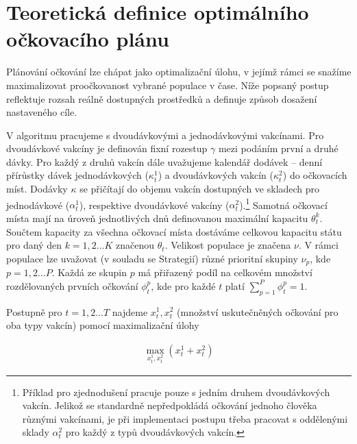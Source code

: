 \section*{Teoretická definice optimálního očkovacího plánu} 
\label{sec_vypocet}

Plánování očkování lze chápat jako optimalizační úlohu, v jejímž rámci se snažíme maximalizovat proočkovanost vybrané populace v čase. Níže popsaný postup reflektuje rozsah reálně dostupných prostředků a definuje způsob dosažení nastaveného cíle.


V algoritmu pracujeme s dvoudávkovými a jednodávkovými vakcínami. Pro dvoudávkové vakcíny je definován fixní rozestup $\gamma$ mezi podáním první a druhé dávky. Pro každý z druhů vakcín dále uvažujeme kalendář dodávek -- denní přírůstky dávek jednodávkových ($\kappa_{t}^{1}$) a dvoudávkových vakcín ($\kappa_{t}^{2}$) do očkovacích míst. Dodávky $\kappa$ se přičítají do objemu vakcín dostupných ve skladech pro jednodávkové ($\alpha_{t}^{1}$), respektive dvoudávkové vakcíny ($\alpha_{t}^{2}$).\footnote{Příklad pro zjednodušení pracuje pouze s jedním druhem dvoudávkových vakcín. Jelikož se standardně nepředpokládá očkování jednoho člověka různými vakcínami, je při implementaci postupu třeba pracovat s oddělenými sklady $\alpha_{t}^{2}$ pro každý z typů dvoudávkových vakcín.} 
Samotná očkovací místa mají na úroveň jednotlivých dnů definovanou maximální kapacitu $\theta_{t}^{k}$. Součtem kapacity za všechna očkovací místa dostáváme celkovou kapacitu státu pro daný den $k=1,2 \dots K$ značenou $\theta_{t}$.
%
Velikost populace je značena $\nu$. V rámci populace lze uvažovat (v souladu se Strategií) různé prioritní skupiny $\nu_{p}$, kde $p=1,2\dots P$. Každá ze skupin $p$ má přiřazený podíl na celkovém množství rozdělovaných prvních očkování $\phi_{t}^{p}$, kde pro každé $t$ platí $\sum_{p=1}^{P}\phi_{t}^{p}=1$. 

%
Postupně pro $t=1,2 \dots T$ najdeme $x_{t}^{1},x_{t}^{2}$ (množství uskutečněných očkování pro oba typy vakcín) pomocí maximalizační úlohy

\begin{equation}
\begin{aligned}
\max_{x_{t}^{1},x_{t}^{2}}(x_{t}^{1}+x_{t}^{2})
\end{aligned}
\end{equation}

